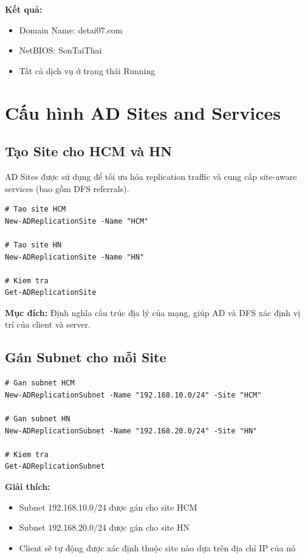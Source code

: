 \textbf{Kết quả:}
\begin{itemize}
    \item Domain Name: detai07.com
    \item NetBIOS: SonTaiThai
    \item Tất cả dịch vụ ở trạng thái Running
\end{itemize}

\section{Cấu hình AD Sites and Services}

\subsection{Tạo Site cho HCM và HN}

AD Sites được sử dụng để tối ưu hóa replication traffic và cung cấp site-aware services (bao gồm DFS referrals).

\begin{lstlisting}
# Tao site HCM
New-ADReplicationSite -Name "HCM"

# Tao site HN
New-ADReplicationSite -Name "HN"

# Kiem tra
Get-ADReplicationSite
\end{lstlisting}

\textbf{Mục đích:} Định nghĩa cấu trúc địa lý của mạng, giúp AD và DFS xác định vị trí của client và server.

\subsection{Gán Subnet cho mỗi Site}

\begin{lstlisting}
# Gan subnet HCM
New-ADReplicationSubnet -Name "192.168.10.0/24" -Site "HCM"

# Gan subnet HN
New-ADReplicationSubnet -Name "192.168.20.0/24" -Site "HN"

# Kiem tra
Get-ADReplicationSubnet
\end{lstlisting}

\textbf{Giải thích:}
\begin{itemize}
    \item Subnet 192.168.10.0/24 được gán cho site HCM
    \item Subnet 192.168.20.0/24 được gán cho site HN
    \item Client sẽ tự động được xác định thuộc site nào dựa trên địa chỉ IP của nó
\end{itemize}


